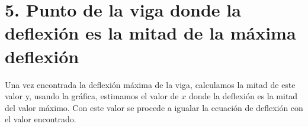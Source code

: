 \documentclass{article}
\begin{document}
\section*{5. Punto de la viga donde la deflexión es la mitad de la máxima deflexión}
Una vez encontrada la deflexión máxima de la viga, calculamos la mitad de este valor y, usando la gráfica, estimamos el valor de \( x \) donde la deflexión es la mitad del valor máximo. Con este valor se procede a igualar la ecuación de deflexión con el valor encontrado.
\end{document}
